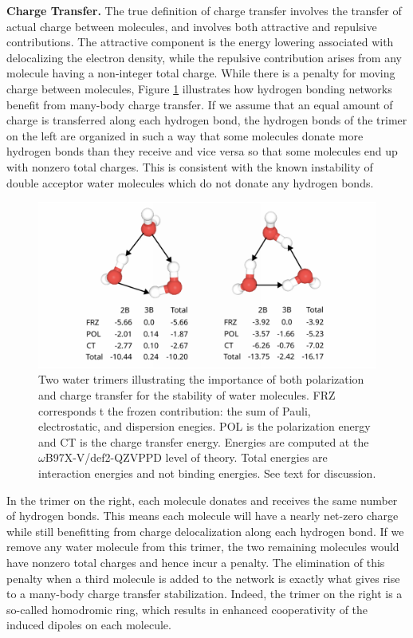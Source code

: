 \documentclass[journal=jctcce,manuscript=article]{achemso}
\begin{document}
\textbf{Charge Transfer.} The true definition of charge transfer involves the transfer of actual charge between molecules\cite{thirman2018characterizing}, and involves both attractive and repulsive contributions. The attractive component is the energy lowering associated with delocalizing
the electron density, while the repulsive contribution arises from any molecule having a non-integer total charge. While there is a penalty for moving charge between molecules, Figure \ref{fig:trimer} illustrates how hydrogen bonding networks benefit from many-body charge transfer. If we assume that an equal amount of charge is transferred along each hydrogen bond, the hydrogen bonds of the trimer on the left are organized in such a way that some molecules donate more hydrogen bonds than they receive and vice versa so that some molecules end up with nonzero total charges. This is consistent with the known instability of double acceptor water molecules which do not donate any hydrogen bonds.\cite{kirov2008identifying}
\begin{figure}[H]
  \includegraphics*[width=\textwidth]{figures/trimer_mbe_example.png}
  \caption{Two water trimers illustrating the importance of both polarization
  and charge transfer for the stability of water molecules. FRZ corresponds t
  the frozen contribution: the sum of Pauli, electrostatic, and dispersion enegies. POL is the polarization
  energy and CT is the charge transfer energy. Energies are computed at the
  $\omega$B97X-V/def2-QZVPPD level of theory. Total energies are
  interaction energies and not binding energies. See text for discussion.}
  \label{fig:trimer}
\end{figure}
In the trimer on the right, each molecule donates and receives the same number of hydrogen bonds. This means each molecule will have a nearly net-zero charge while still benefitting from charge delocalization along each hydrogen bond. If we remove any water molecule from this trimer, the two remaining molecules would have nonzero total charges and hence incur a penalty. The elimination of this penalty when a third molecule is added to the network is exactly what gives rise to a many-body charge transfer stabilization.  Indeed, the trimer on the right is a so-called homodromic ring, which results in enhanced cooperativity of the induced dipoles on each molecule.\cite{xantheas2000cooperativity}
\end{document}
